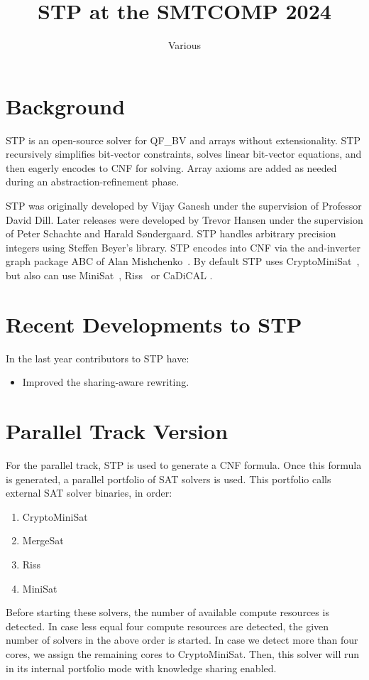 \documentclass{easychair}
\begin{document}
\title{STP at the SMTCOMP 2024}
\author{Various}
\institute{}

\maketitle
\thispagestyle{empty}
\pagestyle{empty}

\section{Background}
STP\cite{Vijay:Thesis:2007, Trevor:Thesis:2012} is an open-source solver for QF\_BV and arrays without extensionality. 
STP recursively simplifies bit-vector constraints, solves linear bit-vector equations, and then eagerly encodes to CNF for solving. 
Array axioms are added as needed during an abstraction-refinement phase.

STP was originally developed by Vijay Ganesh under the supervision of Professor David Dill. 
Later releases were developed by Trevor Hansen under the supervision of Peter Schachte and Harald Søndergaard. 
STP handles arbitrary precision integers using Steffen Beyer's library. 
STP encodes into CNF via the and-inverter graph package ABC of Alan Mishchenko~\cite{Brayton:2010:AAI:2144310.2144317}.
By default STP uses CryptoMiniSat~\cite{CMS:github}, but also can use MiniSat~\cite{MiniSat:github}, Riss~\cite{Riss:github} or CaDiCAL \cite{cadical}.

\section{Recent Developments to STP}
In the last year contributors to STP have:
\begin{itemize}
\item{Improved the sharing-aware rewriting.}
\end{itemize}

\iffalse
	\section{Parallel Track Version}

	For the parallel track, STP is used to generate a CNF formula.
	Once this formula is generated, a parallel portfolio of SAT solvers is used.
	This portfolio calls external SAT solver binaries, in order:
	\begin{enumerate}
	 \item CryptoMiniSat~\cite{CMS:github}
	 \item MergeSat~\cite{MergeSAT:github}
	 \item Riss~\cite{Riss:github}
	 \item MiniSat~\cite{MiniSat:github}
	\end{enumerate}
	Before starting these solvers, the number of available compute resources is detected.
	In case less equal four compute resources are detected, the given number of solvers in the above order is started.
	In case we detect more than four cores, we assign the remaining cores to CryptoMiniSat.
	Then, this solver will run in its internal portfolio mode with knowledge sharing enabled.
\end{document}
